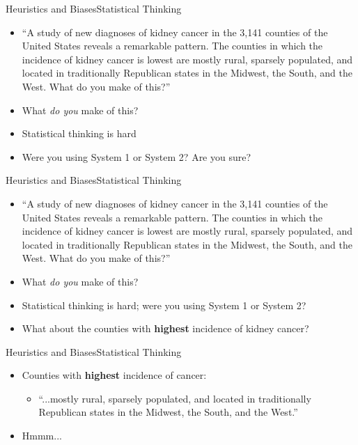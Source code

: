 \documentclass{beamer}
\begin{document}
\begin{frame}{Heuristics and Biases}{Statistical Thinking}
\begin{itemize}
\addtolength{\itemsep}{0.5\baselineskip}
\item ``A study of new diagnoses of kidney cancer in the 3,141 counties of the United States reveals a remarkable pattern. The counties in which the incidence of kidney cancer is lowest are mostly rural, sparsely populated, and located in traditionally Republican states in the Midwest, the South, and the West. What do you make of this?''
\item What {\it do you} make of this?
\item Statistical thinking is hard
\item Were you using System 1 or System 2? Are you sure?
\end{itemize}
\end{frame}

\begin{frame}{Heuristics and Biases}{Statistical Thinking}
\begin{itemize}
\addtolength{\itemsep}{0.5\baselineskip}
\item ``A study of new diagnoses of kidney cancer in the 3,141 counties of the United States reveals a remarkable pattern. The counties in which the incidence of kidney cancer is lowest are mostly rural, sparsely populated, and located in traditionally Republican states in the Midwest, the South, and the West. What do you make of this?''
\item What {\it do you} make of this?
\item Statistical thinking is hard; were you using System 1 or System 2?
\item What about the counties with {\bf highest} incidence of kidney cancer?
\end{itemize}
\end{frame}


\begin{frame}{Heuristics and Biases}{Statistical Thinking}
\begin{itemize}
\addtolength{\itemsep}{0.5\baselineskip}
\item Counties with {\bf highest} incidence of cancer:
  \begin{itemize}
  \item ``...mostly rural, sparsely populated, and located in traditionally Republican states in the Midwest, the South, and the West.''
  \end{itemize}
\item Hmmm...
\end{itemize}
\end{frame}
\end{document}
